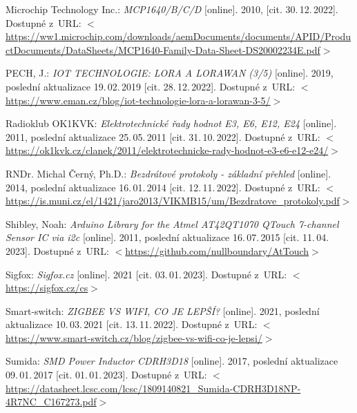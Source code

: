 \begin{thebibliography}{99}
    Microchip Technology Inc.:
    \emph{MCP1640/B/C/D}\/ [online].
    2010, [cit. 30.\,12.\,2022].
    Dostupné z~URL: 
    \(<\)\url{https://ww1.microchip.com/downloads/aemDocuments/documents/APID/ProductDocuments/DataSheets/MCP1640-Family-Data-Sheet-DS20002234E.pdf}\(>\)

    PECH, J.:
    \emph{IOT TECHNOLOGIE: LORA A LORAWAN (3/5)}\/ [online].
    2019, poslední aktualizace 19.\,02.\,2019 [cit. 28.\,12.\,2022].
    Dostupné z~URL:
    \(<\)\url{https://www.eman.cz/blog/iot-technologie-lora-a-lorawan-3-5/}\(>\)

    Radioklub OK1KVK:
    \emph{Elektrotechnické řady hodnot E3, E6, E12, E24}\/ [online].
    2011, poslední aktualizace 25.\,05.\,2011 [cit. 31.\,10.\,2022].
    Dostupné z~URL: 
    \(<\)\url{https://ok1kvk.cz/clanek/2011/elektrotechnicke-rady-hodnot-e3-e6-e12-e24/}\(>\)

    RNDr. Michal Černý, Ph.D.:
    \emph{Bezdrátové protokoly - základní přehled}\/ [online].
    2014, poslední aktualizace 16.\,01.\,2014 [cit. 12.\,11.\,2022].
    Dostupné z~URL: 
    \(<\)\url{https://is.muni.cz/el/1421/jaro2013/VIKMB15/um/Bezdratove_protokoly.pdf}\(>\)

    Shibley, Noah:
    \emph{Arduino Library for the Atmel AT42QT1070 QTouch 7-channel Sensor IC via i2c}\/ [online].
    2011, poslední aktualizace 16.\,07.\,2015 [cit. 11.\,04.\,2023].
    Dostupné z~URL: 
    \(<\)\url{https://github.com/nullboundary/AtTouch}\(>\)

    Sigfox:
    \emph{Sigfox.cz}\/ [online].
    2021 [cit. 03.\,01.\,2023].
    Dostupné z~URL: 
    \(<\)\url{https://sigfox.cz/cs}\(>\)

    Smart-switch:
    \emph{ZIGBEE VS WIFI, CO JE LEPŠÍ?}\/ [online].
    2021, poslední aktualizace 10.\,03.\,2021 [cit. 13.\,11.\,2022].
    Dostupné z~URL: 
    \(<\)\url{https://www.smart-switch.cz/blog/zigbee-vs-wifi-co-je-lepsi/}\(>\)


    Sumida:
    \emph{SMD Power Inductor CDRH3D18}\/ [online].
    2017, poslední aktualizace 09.\,01.\,2017 [cit. 01.\,01.\,2023]. 
    Dostupné z~URL:
    \(<\)\url{https://datasheet.lcsc.com/lcsc/1809140821_Sumida-CDRH3D18NP-4R7NC_C167273.pdf}\(>\)


\end{thebibliography}
